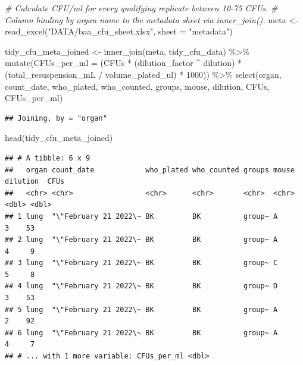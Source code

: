\documentclass[
]{book}
\newenvironment{Shaded}{\begin{snugshade}}{\end{snugshade}}
\newcommand{\AttributeTok}[1]{\textcolor[rgb]{0.77,0.63,0.00}{#1}}
\newcommand{\CommentTok}[1]{\textcolor[rgb]{0.56,0.35,0.01}{\textit{#1}}}
\newcommand{\DecValTok}[1]{\textcolor[rgb]{0.00,0.00,0.81}{#1}}
\newcommand{\FunctionTok}[1]{\textcolor[rgb]{0.00,0.00,0.00}{#1}}
\newcommand{\NormalTok}[1]{#1}
\newcommand{\OtherTok}[1]{\textcolor[rgb]{0.56,0.35,0.01}{#1}}
\newcommand{\SpecialCharTok}[1]{\textcolor[rgb]{0.00,0.00,0.00}{#1}}
\newcommand{\StringTok}[1]{\textcolor[rgb]{0.31,0.60,0.02}{#1}}
\begin{document}
\begin{Shaded}
\begin{Highlighting}[]
\CommentTok{\# Calculate CFU/ml for every qualifying replicate between 10{-}75 CFUs. }
\CommentTok{\# Column binding by organ name to the metadata sheet via inner\_join().}
\NormalTok{meta }\OtherTok{\textless{}{-}} \FunctionTok{read\_excel}\NormalTok{(}\StringTok{"DATA/baa\_cfu\_sheet.xlsx"}\NormalTok{, }\AttributeTok{sheet =} \StringTok{"metadata"}\NormalTok{)}

\NormalTok{tidy\_cfu\_meta\_joined }\OtherTok{\textless{}{-}} \FunctionTok{inner\_join}\NormalTok{(meta, tidy\_cfu\_data) }\SpecialCharTok{\%\textgreater{}\%}
  \FunctionTok{mutate}\NormalTok{(}\AttributeTok{CFUs\_per\_ml =}\NormalTok{ (CFUs }\SpecialCharTok{*}\NormalTok{ (dilution\_factor }\SpecialCharTok{\^{}}\NormalTok{ dilution) }\SpecialCharTok{*} 
\NormalTok{                          (total\_resuspension\_mL }\SpecialCharTok{/}\NormalTok{ volume\_plated\_ul) }\SpecialCharTok{*} \DecValTok{1000}\NormalTok{)) }\SpecialCharTok{\%\textgreater{}\%}
  \FunctionTok{select}\NormalTok{(organ, count\_date, who\_plated, who\_counted, groups,  mouse, dilution,  }
\NormalTok{         CFUs, CFUs\_per\_ml) }
\end{Highlighting}
\end{Shaded}

\begin{verbatim}
## Joining, by = "organ"
\end{verbatim}

\begin{Shaded}
\begin{Highlighting}[]
\FunctionTok{head}\NormalTok{(tidy\_cfu\_meta\_joined)}
\end{Highlighting}
\end{Shaded}

\begin{verbatim}
## # A tibble: 6 x 9
##   organ count_date            who_plated who_counted groups mouse dilution  CFUs
##   <chr> <chr>                 <chr>      <chr>       <chr>  <chr>    <dbl> <dbl>
## 1 lung  "\"February 21 2022\~ BK         BK          group~ A            3    53
## 2 lung  "\"February 21 2022\~ BK         BK          group~ A            4     9
## 3 lung  "\"February 21 2022\~ BK         BK          group~ C            5     8
## 4 lung  "\"February 21 2022\~ BK         BK          group~ D            3    53
## 5 lung  "\"February 21 2022\~ BK         BK          group~ A            2    92
## 6 lung  "\"February 21 2022\~ BK         BK          group~ A            4     7
## # ... with 1 more variable: CFUs_per_ml <dbl>
\end{verbatim}
\end{document}
